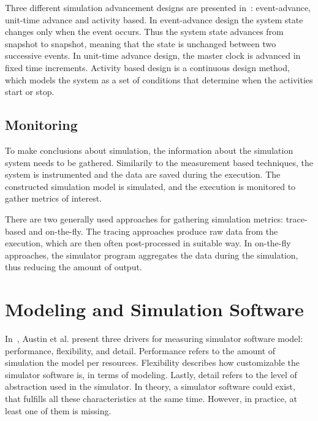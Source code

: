 Three different simulation advancement designs are presented in~\cite{peros:2009:simulation}: event-advance, unit-time advance and activity based. In event-advance design the system state changes only when the event occurs. Thus the system state advances from snapshot to snapshot, meaning that the state is unchanged between two successive events. In unit-time advance design, the master clock is advanced in fixed time increments. Activity based design is a continuous design method, which models the system as a set of conditions that determine when the activities start or stop.~\cite{peros:2009:simulation}

\subsection{Monitoring}
To make conclusions about simulation, the information about the simulation system needs to be gathered. Similarily to the measurement based techniques, the system is instrumented and the data are saved during the execution. The constructed simulation model is simulated, and the execution is monitored to gather metrics of interest.~\cite{jain:1991:AOCSPA, peros:2009:simulation}

There are two generally used approaches for gathering simulation metrics: trace-based and on-the-fly. The tracing approaches produce raw data from the execution, which are then often post-processed in suitable way. In on-the-fly approaches, the simulator program aggregates the data during the simulation, thus reducing the amount of output.~\cite{jain:1991:AOCSPA, peros:2009:simulation}

\section{Modeling and Simulation Software}



In~\cite{Austin:2002:SimpleScalar}, Austin et al. present three drivers for measuring simulator software model: performance, flexibility, and detail. Performance refers to the amount of simulation the model per resources. Flexibility describes how customizable the simulator software is, in terms of modeling. Lastly, detail refers to the level of abstraction used in the simulator. In theory, a simulator software could exist, that fulfills all these characteristics at the same time. However, in practice, at least one of them is missing.~\cite{Austin:2002:SimpleScalar}


